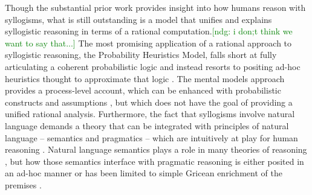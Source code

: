 \documentclass[floatsintext, doc]{apa6}
\newcommand{\ndg}[1]{{\textcolor{Green}{[ndg: #1]}}}
\begin{document}
Though the substantial prior work provides insight into how humans reason with syllogisms, what is still outstanding is a model that unifies and explains syllogistic reasoning in terms of a rational computation.\ndg{i don;t think we want to say that...}
The most promising application of a rational approach to syllogistic reasoning, the Probability Heuristics Model, falls short at fully articulating a coherent probabilistic logic and instead resorts to positing ad-hoc heuristics thought to approximate that logic \cite{Chater1999}.
The mental models approach provides a process-level account, which can be enhanced with probabilistic constructs and assumptions \cite{johnson2015logic}, but which does not have the goal of providing a unified rational analysis. 
%
%
Furthermore, the fact that syllogisms involve natural language demands a theory that can be integrated with principles of natural language -- semantics and pragmatics -- which are intuitively at play for human reasoning \cite{sperber1986relevance,mercier2017enigma}.
Natural language semantics plays a role in many theories of reasoning \cite{JL1978, Khemlani2012, geurts2003reasoning}, but how those semantics interface with pragmatic reasoning is either posited in an ad-hoc manner \cite{Chater1999} or has been limited to simple Gricean enrichment of the premises \cite{Roberts2001}.	

\end{document}
